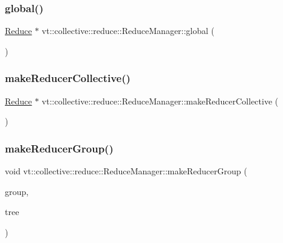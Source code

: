 \subsubsection{\texorpdfstring{global()}{global()}}
{\footnotesize\ttfamily \hyperlink{structvt_1_1collective_1_1reduce_1_1_reduce}{Reduce} $\ast$ vt\+::collective\+::reduce\+::\+Reduce\+Manager\+::global (\begin{DoxyParamCaption}{ }\end{DoxyParamCaption})}

\mbox{\label{structvt_1_1collective_1_1reduce_1_1_reduce_manager_a4b81ceab5d9f081f393dd68cece25935}} 
\subsubsection{\texorpdfstring{make\+Reducer\+Collective()}{makeReducerCollective()}}
{\footnotesize\ttfamily \hyperlink{structvt_1_1collective_1_1reduce_1_1_reduce}{Reduce} $\ast$ vt\+::collective\+::reduce\+::\+Reduce\+Manager\+::make\+Reducer\+Collective (\begin{DoxyParamCaption}{ }\end{DoxyParamCaption})}

\mbox{\label{structvt_1_1collective_1_1reduce_1_1_reduce_manager_a44fa84680d3b310f4cb3f6c776a31751}} 
\subsubsection{\texorpdfstring{make\+Reducer\+Group()}{makeReducerGroup()}}
{\footnotesize\ttfamily void vt\+::collective\+::reduce\+::\+Reduce\+Manager\+::make\+Reducer\+Group (\begin{DoxyParamCaption}\item[{\hyperlink{namespacevt_a27b5e4411c9b6140c49100e050e2f743}{Group\+Type} const \&}]{group,  }\item[{\hyperlink{structvt_1_1collective_1_1tree_1_1_tree}{collective\+::tree\+::\+Tree} $\ast$}]{tree }\end{DoxyParamCaption})}


